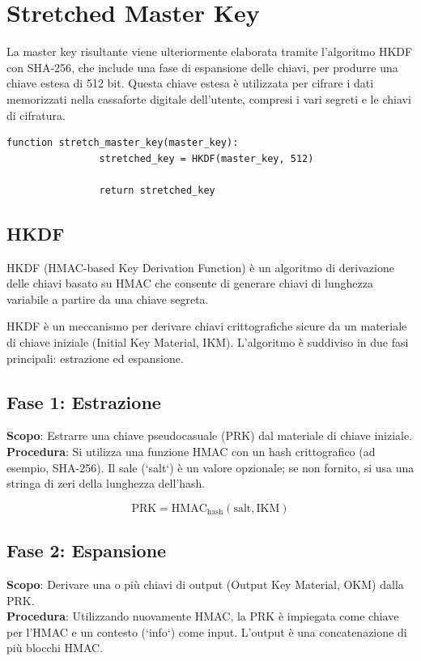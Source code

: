 \documentclass[a4paper,12pt]{report}
\begin{document}
		\section{Stretched Master Key}
		La master key risultante viene
		ulteriormente elaborata tramite l'algoritmo HKDF con SHA-256, che include una
		fase di espansione delle chiavi, per produrre una chiave estesa di 512 bit.
		Questa chiave estesa è utilizzata per cifrare i dati memorizzati nella
		cassaforte digitale dell'utente, compresi i vari segreti e le chiavi di
		cifratura.
		\begin{lstlisting}[style=pseudocode]
			function stretch_master_key(master_key):
				stretched_key = HKDF(master_key, 512)

				return stretched_key
		\end{lstlisting}
		\subsection{HKDF}
			HKDF (HMAC-based Key Derivation Function) è un algoritmo di derivazione delle
			chiavi basato su HMAC che consente di generare chiavi di lunghezza variabile a
			partire da una chiave segreta. 
			
			HKDF è un meccanismo per derivare chiavi crittografiche sicure da un
			materiale di chiave iniziale (Initial Key Material, IKM). L'algoritmo è
			suddiviso in due fasi principali: estrazione ed espansione.

		\subsection*{Fase 1: Estrazione}

		\textbf{Scopo}: Estrarre una chiave pseudocasuale (PRK) dal materiale di
		chiave iniziale.\\
		\textbf{Procedura}: Si utilizza una funzione HMAC con un hash
		crittografico (ad esempio, SHA-256). Il sale (`salt`) è un valore
		opzionale; se non fornito, si usa una stringa di zeri della lunghezza
		dell'hash\cite{HMAC-expand}.

		\[
		\text{PRK} = \text{HMAC}_\text{hash}(\text{salt}, \text{IKM})
		\]

		\subsection*{Fase 2: Espansione}

		\textbf{Scopo}: Derivare una o più chiavi di output (Output Key
		Material, OKM) dalla PRK.\\
		\textbf{Procedura}: Utilizzando nuovamente HMAC, la PRK è impiegata come
		chiave per l'HMAC e un contesto (`info`) come input. L'output è una
		concatenazione di più blocchi HMAC. \cite{HMAC-expand}
\end{document}
